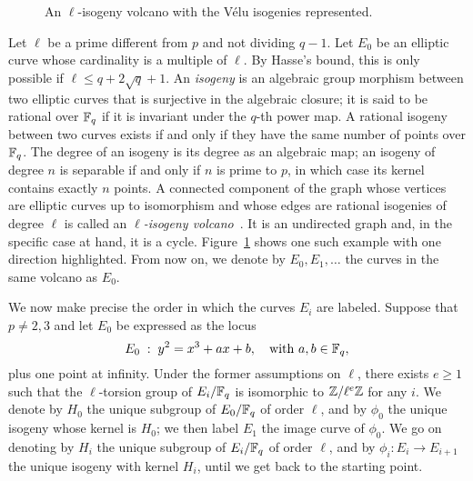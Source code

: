 \documentclass{sig-alternate}
\begin{document}
\begin{figure}
  \centering
  \caption{An $\ell$-isogeny volcano with the Vélu isogenies
    represented.}
  \label{fig:volcano}
\end{figure}

Let $\ell$ be a prime different from $p$ and not dividing $q-1$. Let
$E_0$ be an elliptic curve whose cardinality is a multiple of
$\ell$. By Hasse's bound, this is only possible if $\ell\le q +
2\sqrt{q} + 1$. An \emph{isogeny} is an algebraic group morphism
between two elliptic curves that is surjective in the algebraic
closure; it is said to be rational over $\mathbb{F}_q$ if it is invariant
under the $q$-th power map. A rational isogeny between two curves
exists if and only if they have the same number of points over
$\mathbb{F}_q$. The degree of an isogeny is its degree as an algebraic map; an
isogeny of degree $n$ is separable if and only if $n$ is prime to $p$,
in which case its kernel contains exactly $n$ points. A connected
component of the graph whose vertices are elliptic curves up to
isomorphism and whose edges are rational isogenies of degree $\ell$ is
called an \emph{$\ell$-isogeny
  volcano}~\cite{kohel,fouquet+morain02}. It is an undirected graph
and, in the specific case at hand, it is a cycle.
Figure~\ref{fig:volcano} shows one such example with one direction
highlighted. From now on, we denote by $E_0,E_1,\dots$ the curves in
the same volcano as $E_0$.

We now make precise the order in which the curves $E_i$ are
labeled. Suppose that $p\ne2,3$ and let $E_0$ be expressed as the
locus
\begin{equation}
  E_0 \;:\; y^2 = x^3 + ax + b,
  \quad\text{with $a,b\in\mathbb{F}_q$},
\end{equation}
plus one point at infinity. Under the former assumptions on $\ell$,
there exists $e\ge1$ such that the $\ell$-torsion group of $E_i/\mathbb{F}_q$
is isomorphic to $\mathbb{Z}/\ell^e\mathbb{Z}$ for any $i$. We denote by $H_0$ the
unique subgroup of $E_0/\mathbb{F}_q$ of order $\ell$, and by $\phi_0$ the
unique isogeny whose kernel is $H_0$; we then label $E_1$ the image
curve of $\phi_0$. We go on denoting by $H_i$ the unique subgroup of
$E_i/\mathbb{F}_q$ of order $\ell$, and by $\phi_i:E_i\to E_{i+1}$ the unique
isogeny with kernel $H_i$, until we get back to the starting point.
\end{document}
